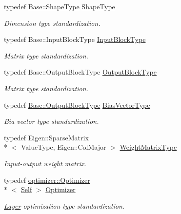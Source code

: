 \begin{DoxyCompactItemize}
typedef \hyperlink{classffnn_1_1layer_1_1internal_1_1_interface_a945709b1d0ea54a51539b80d04485f5f}{Base\-::\-Shape\-Type} \hyperlink{classffnn_1_1layer_1_1_sparsely_connected_aafb3514023fb9b1eaa11e4c4dbff4c99}{Shape\-Type}
\begin{DoxyCompactList}\small\item\em Dimension type standardization. \end{DoxyCompactList}\item 
typedef Base\-::\-Input\-Block\-Type \hyperlink{classffnn_1_1layer_1_1_sparsely_connected_ad90fd9b4c687e4dc515cf8ca2796043c}{Input\-Block\-Type}
\begin{DoxyCompactList}\small\item\em Matrix type standardization. \end{DoxyCompactList}\item 
typedef Base\-::\-Output\-Block\-Type \hyperlink{classffnn_1_1layer_1_1_sparsely_connected_aacf4fb49a3f57aba90e55d8d3c63cf45}{Output\-Block\-Type}
\begin{DoxyCompactList}\small\item\em Matrix type standardization. \end{DoxyCompactList}\item 
typedef \hyperlink{classffnn_1_1layer_1_1_hidden_abb03ddc71360cc7ebdab03cd4d1553ee}{Base\-::\-Output\-Block\-Type} \hyperlink{classffnn_1_1layer_1_1_sparsely_connected_ad2d566cbb6c54c8723d79737075b4a00}{Bias\-Vector\-Type}
\begin{DoxyCompactList}\small\item\em Bia vector type standardization. \end{DoxyCompactList}\item 
typedef Eigen\-::\-Sparse\-Matrix\\*
$<$ Value\-Type, Eigen\-::\-Col\-Major $>$ \hyperlink{classffnn_1_1layer_1_1_sparsely_connected_acafafa368b81042965eed9607cad2dbd}{Weight\-Matrix\-Type}
\begin{DoxyCompactList}\small\item\em Input-\/output weight matrix. \end{DoxyCompactList}\item 
typedef \hyperlink{classffnn_1_1optimizer_1_1_optimizer}{optimizer\-::\-Optimizer}\\*
$<$ \hyperlink{classffnn_1_1layer_1_1_sparsely_connected_ad27c96a5f26e2f44fb25bebd9a838666}{Self} $>$ \hyperlink{classffnn_1_1layer_1_1_sparsely_connected_a87466efb64ebf340fa07194c94846ace}{Optimizer}
\begin{DoxyCompactList}\small\item\em \hyperlink{classffnn_1_1layer_1_1_layer}{Layer} optimization type standardization. \end{DoxyCompactList}\end{DoxyCompactItemize}
